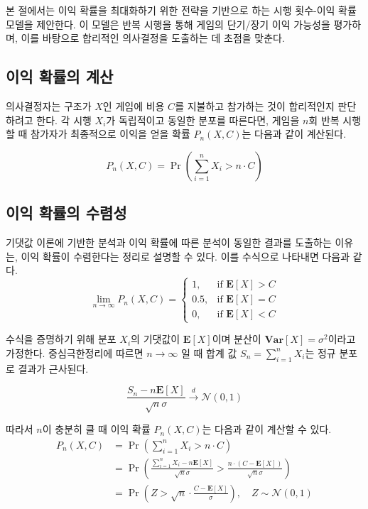 본 절에서는 이익 확률을 최대화하기 위한 전략을 기반으로 하는 시행 횟수-이익 확률 모델을 제안한다. 이 모델은 반복 시행을 통해 게임의 단기/장기 이익 가능성을 평가하며, 이를 바탕으로 합리적인 의사결정을 도출하는 데 초점을 맞춘다.

\subsection{이익 확률의 계산}

의사결정자는 구조가 $X$인 게임에 비용 $C$를 지불하고 참가하는 것이 합리적인지 판단하려고 한다. 각 시행 $X_i$가 독립적이고 동일한 분포를 따른다면, 게임을 $n$회 반복 시행할 때 참가자가 최종적으로 이익을 얻을 확률 $P_n(X, C)$는 다음과 같이 계산된다.

$$
  P_n(X, C)=\Pr\left(\sum_{i=1}^n X_i>n\cdot C\right)
$$

\subsection{이익 확률의 수렴성}

기댓값 이론에 기반한 분석과 이익 확률에 따른 분석이 동일한 결과를 도출하는 이유는, 이익 확률이 수렴한다는 정리로 설명할 수 있다. 이를 수식으로 나타내면 다음과 같다.
\[
  \lim_{n\rightarrow \infty} P_n(X, C)
  =\begin{cases}
    1,   & \text{if } \mathbf E[X]>C \\
    0.5, & \text{if } \mathbf E[X]=C \\
    0,   & \text{if } \mathbf E[X]<C
  \end{cases}
\]

수식을 증명하기 위해 분포 $X_i$의 기댓값이 $\mathbf E[X]$이며 분산이 $\mathbf{Var}[X] = \sigma^2$이라고 가정한다. 중심극한정리에 따르면 $n \rightarrow \infty$ 일 때 합계 값 $S_n = \sum_{i=1}^n X_i$는 정규 분포로 결과가 근사된다.

\[
  \frac{S_n - n\mathbf E[X]}{\sqrt{n}\sigma} \overset{d}{\rightarrow} \mathcal{N}(0, 1)
\]

따라서 $n$이 충분히 클 때 이익 확률 $P_n(X, C)$는 다음과 같이 계산할 수 있다.
\begin{align*}
  P_n(X, C) & = \Pr\left(\sum_{i=1}^n X_i > n \cdot C\right)                                                                                   \\
            & = \Pr\left(\frac{\sum_{i=1}^n X_i - n \mathbf{E}[X]}{\sqrt{n}\sigma} > \frac{n \cdot (C - \mathbf{E}[X])}{\sqrt{n}\sigma}\right) \\
            & = \Pr\left(Z > \sqrt{n} \cdot \frac{C - \mathbf{E}[X]}{\sigma}\right), \quad Z \sim \mathcal{N}(0, 1)
\end{align*}

